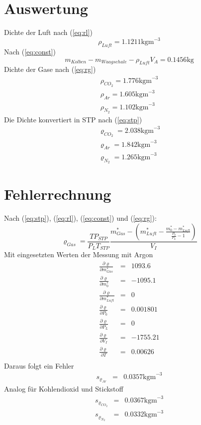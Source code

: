 \documentclass[12pt,a4paper]{article}
\begin{document}
\section*{Auswertung}
Dichte der Luft nach (\ref{eq:rl})
\[ \rho_{Luft} = 1.1211 \mbox{kgm}^{-3} \]
Nach (\ref{eq:const})
\[ m_{Kolben} - m_{Waagschale} - \rho_{Luft} V_A = 0.1456 \mbox{kg} \]
Dichte der Gase nach (\ref{eq:rg})
\begin{eqnarray*}
\rho_{CO_2} = 1.776 \mbox{kgm}^{-3} \\
\rho_{Ar} = 1.605 \mbox{kgm}^{-3} \\
\rho_{N_2} = 1.102 \mbox{kgm}^{-3}
\end{eqnarray*}
Die Dichte konvertiert in STP nach (\ref{eq:stp})
\begin{eqnarray*}
\varrho_{CO_2} = 2.038 \mbox{kgm}^{-3} \\
\varrho_{Ar} = 1.842 \mbox{kgm}^{-3} \\
\varrho_{N_2} = 1.265 \mbox{kgm}^{-3}
\end{eqnarray*}


\section*{Fehlerrechnung}
Nach (\ref{eq:stp}), (\ref{eq:rl}), (\ref{eq:const}) und (\ref{eq:rg}):
\[ \varrho _{Gas} = \frac{TP_{STP}}{P_L T_{STP}} \frac{m^*_{Gas} - \left(  m^*_{Luft} - \frac{m^*_0 - m^*_{Luft}}{\frac{P_0}{P_L}-1}\right) }{V_I} \]
Mit eingesetzten Werten der Messung mit Argon
\begin{eqnarray*}
\frac{\partial \varrho}{\partial m^*_{Gas}} & = & 1093.6 \\
\frac{\partial \varrho}{\partial m^*_{0}} & = & -1095.1 \\
\frac{\partial \varrho}{\partial m^*_{Luft}} & = & 0 \\
\frac{\partial \varrho}{\partial P_0} & = & 0.001801 \\
\frac{\partial \varrho}{\partial P_L} & = & 0 \\
\frac{\partial \varrho}{\partial V_I} & = & -1755.21 \\
\frac{\partial \varrho}{\partial T} & = & 0.00626 \\
\end{eqnarray*}
Daraus folgt ein Fehler
\begin{eqnarray*}
s_{\varrho_{Ar}} & = & 0.0357 \mbox{kgm}^{-3}
\end{eqnarray*}
Analog für Kohlendioxid und Stickstoff
\begin{eqnarray*}
s_{\varrho_{CO_2}} & = & 0.0367 \mbox{kgm}^{-3}\\
s_{\varrho_{N_2}} & = & 0.0332 \mbox{kgm}^{-3}
\end{eqnarray*}
\end{document}

